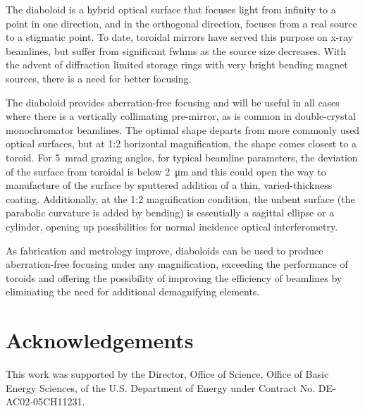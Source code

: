 \documentclass{iucr}       %
\begin{document}
The diaboloid is a hybrid optical surface that focuses light from infinity to a point in one direction, and in the orthogonal direction, focuses from a real source to a stigmatic point. To date, toroidal mirrors have served this purpose on x-ray beamlines, but suffer from significant fwhms as the source size decreases. With the advent of diffraction limited storage rings with very bright bending magnet sources, there is a need for better focusing. 

The diaboloid provides aberration-free focusing and will be useful in all cases where there is a vertically collimating pre-mirror, as is common in double-crystal monochromator beamlines. The optimal shape departs from more commonly used optical surfaces, but at 1:2 horizontal magnification, the shape comes closest to a toroid.
For \SI{5}{\milli\radian} grazing angles, for typical beamline parameters, the deviation of the surface from toroidal is below \SI{2}{\micro\meter} and this could open the way to manufacture of the surface by sputtered addition of a thin, varied-thickness coating. Additionally, at the 1:2 magnification condition, the unbent surface (the parabolic curvature is added by bending) is essentially a sagittal ellipse or a cylinder, opening up possibilities for normal incidence optical interferometry.

As fabrication and metrology improve, diaboloids can be used to produce aberration-free focusing under any magnification, exceeding the performance of toroids and offering the possibility of improving the efficiency of beamlines by eliminating the need for additional demagnifying elements. 




\vspace{5mm}
\section{Acknowledgements}    
 
 
This work was supported by the Director, Office of Science, Office of Basic Energy Sciences, of the U.S. Department of Energy under Contract No. DE-AC02-05CH11231.
\end{document}
